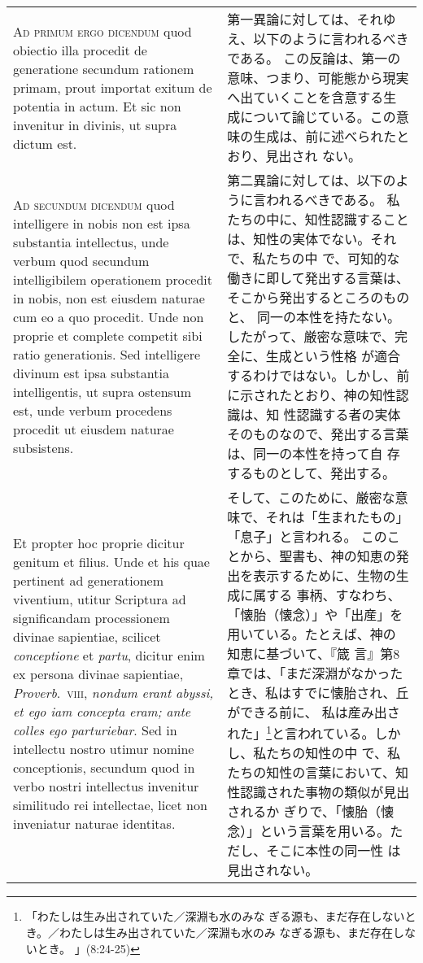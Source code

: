 \documentclass[10pt]{jsarticle} %
\begin{document}
\begin{longtable}{p{21em}p{21em}}
\\



{\scshape Ad primum ergo dicendum} quod obiectio illa procedit de generatione
secundum rationem primam, prout importat exitum de potentia in actum. Et
sic non invenitur in divinis, ut supra dictum est.


&

第一異論に対しては、それゆえ、以下のように言われるべきである。
この反論は、第一の意味、つまり、可能態から現実へ出ていくことを含意する生
 成について論じている。この意味の生成は、前に述べられたとおり、見出され
 ない。

\\



{\scshape Ad secundum dicendum} quod intelligere in nobis non est ipsa substantia
intellectus, unde verbum quod secundum intelligibilem operationem
procedit in nobis, non est eiusdem naturae cum eo a quo procedit. Unde
non proprie et complete competit sibi ratio generationis. Sed
intelligere divinum est ipsa substantia intelligentis, ut supra ostensum
est, unde verbum procedens procedit ut eiusdem naturae subsistens. 

&

第二異論に対しては、以下のように言われるべきである。
私たちの中に、知性認識することは、知性の実体でない。それで、私たちの中
 で、可知的な働きに即して発出する言葉は、そこから発出するところのものと、
 同一の本性を持たない。したがって、厳密な意味で、完全に、生成という性格
 が適合するわけではない。しかし、前に示されたとおり、神の知性認識は、知
 性認識する者の実体そのものなので、発出する言葉は、同一の本性を持って自
 存するものとして、発出する。

\\

Et
propter hoc proprie dicitur genitum et filius. Unde et his quae
pertinent ad generationem viventium, utitur Scriptura ad significandam
processionem divinae sapientiae, scilicet {\itshape conceptione} et {\itshape partu}, dicitur
enim ex persona divinae sapientiae, {\itshape Proverb}.~{\scshape viii}, {\itshape nondum erant abyssi,
et ego iam concepta eram; ante colles ego parturiebar}. Sed in intellectu
nostro utimur nomine conceptionis, secundum quod in verbo nostri
intellectus invenitur similitudo rei intellectae, licet non inveniatur
naturae identitas.


&

そして、このために、厳密な意味で、それは「生まれたもの」「息子」と言われる。
このことから、聖書も、神の知恵の発出を表示するために、生物の生成に属する
 事柄、すなわち、「懐胎（懐念）」や「出産」を用いている。たとえば、神の
 知恵に基づいて、『箴
 言』第8章では、「まだ深淵がなかったとき、私はすでに懐胎され、丘ができる前に、
 私は産み出された」\footnote{「わたしは生み出されていた／深淵も水のみな
 ぎる源も、まだ存在しないとき。／わたしは生み出されていた／深淵も水のみ
 なぎる源も、まだ存在しないとき。 」(8:24-25)}と言われている。しかし、私たちの知性の中
 で、私たちの知性の言葉において、知性認識された事物の類似が見出されるか
 ぎりで、「懐胎（懐念）」という言葉を用いる。ただし、そこに本性の同一性
 は見出されない。



\end{longtable}
\end{document}
